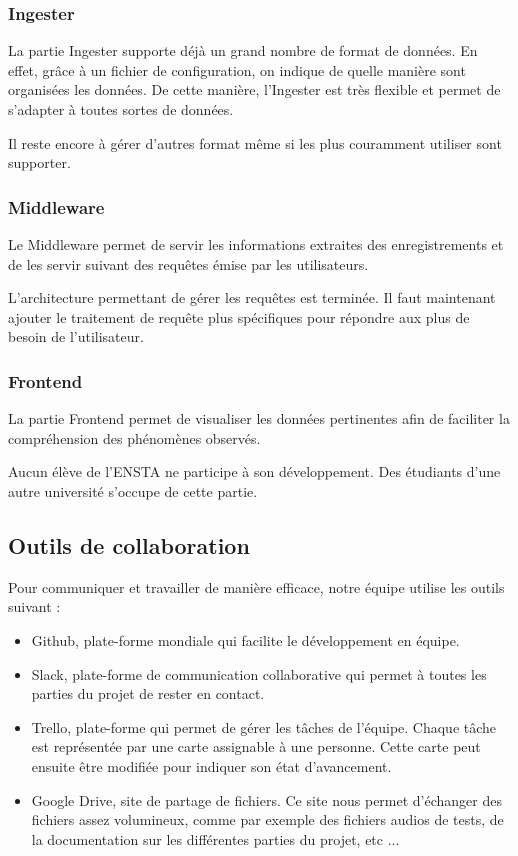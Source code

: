\documentclass{article}
\begin{document}
\subsubsection{Ingester}

La partie Ingester supporte déjà un grand nombre de format de données. En effet, grâce à un fichier de configuration, on indique de quelle manière sont organisées les données. De cette manière, l'Ingester est très flexible et permet de s'adapter à toutes sortes de données. 

Il reste encore à gérer d'autres format même si les plus couramment utiliser sont supporter.

\subsubsection{Middleware}

Le Middleware permet de servir les informations extraites des enregistrements et de les servir suivant des requêtes émise par les utilisateurs.

L'architecture permettant de gérer les requêtes est terminée. Il faut maintenant ajouter le traitement de requête plus spécifiques pour répondre aux plus de besoin de l'utilisateur.

\subsubsection{Frontend}

La partie Frontend permet de visualiser les données pertinentes afin de faciliter la compréhension des phénomènes observés.

Aucun élève de l'ENSTA ne participe à son développement. Des étudiants d'une autre université s'occupe de cette partie.

\subsection{Outils de collaboration}

Pour communiquer et travailler de manière efficace, notre équipe utilise les outils suivant : 

\begin{itemize}

	\item Github, plate-forme mondiale qui facilite le développement en équipe.
	
	\item Slack, plate-forme de communication collaborative qui permet à toutes les parties du projet de rester en contact.
	
	\item Trello, plate-forme qui permet de gérer les tâches de l'équipe. Chaque tâche est représentée par une carte assignable à une personne. Cette carte peut ensuite être modifiée pour indiquer son état d'avancement.
	
	\item Google Drive, site de partage de fichiers. Ce site nous permet d'échanger des fichiers assez volumineux, comme par exemple des fichiers audios de tests, de la documentation sur les différentes parties du projet, etc ...

\end{itemize}
\end{document}
